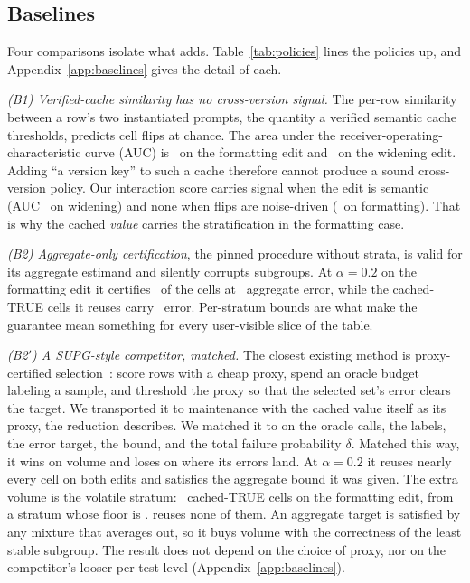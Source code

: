 \keepheading
\subsection{Baselines}
\label{sec:exp-baselines}

Four comparisons isolate what \sivm{} adds. Table~\ref{tab:policies}
lines the policies up, and Appendix~\ref{app:baselines} gives the
detail of each.

\emph{(B1) Verified-cache similarity has no cross-version signal.} The
per-row similarity between a row's two instantiated prompts, the
quantity a verified semantic cache thresholds, predicts cell flips at
chance. The area under the receiver-operating-characteristic curve
(AUC) is \aucVcacheF\ on the formatting edit and \aucVcacheW\ on the
widening edit. Adding ``a version key'' to such a cache therefore
cannot produce a sound cross-version policy. Our interaction score
carries signal when the edit is semantic (AUC \aucInterW\ on widening)
and none when flips are noise-driven (\aucInterF\ on formatting). That
is why the cached \emph{value} carries the stratification in the
formatting case.

\emph{(B2) Aggregate-only certification}, the pinned procedure without
strata, is valid for its aggregate estimand and silently corrupts
subgroups. At $\alpha{=}0.2$ on the formatting edit it certifies
\aggFsavings\ of the cells at \aggFrealized\ aggregate error, while
the cached-TRUE cells it reuses carry \aggFsubgroup\ error. Per-stratum
bounds are what make the guarantee mean something for every
user-visible slice of the table.

\emph{(B2$'$) A SUPG-style competitor, matched.} The closest existing
method is proxy-certified selection~\cite{supg}: score rows with a cheap
proxy, spend an oracle budget labeling a sample, and threshold the
proxy so that the selected set's error clears the target. We
transported it to maintenance with the cached value itself as its
proxy, the reduction  describes. We matched it to
\sivm{} on the oracle calls, the labels, the error target, the bound,
and the total failure probability $\delta$. Matched this way, it wins on
volume and loses on where its errors land. At $\alpha{=}0.2$ it reuses
nearly every cell on both edits and satisfies the aggregate bound it
was given. The extra volume is the volatile stratum: \hhSupgTrueRows\
cached-TRUE cells on the formatting edit, from a stratum whose floor is
\floorTrueStratum. \sivm{} reuses none of them. An aggregate target is
satisfied by any mixture that averages out, so it buys volume with the
correctness of the least stable subgroup. The result does not depend on
the choice of proxy, nor on the competitor's looser per-test level
(Appendix~\ref{app:baselines}).

